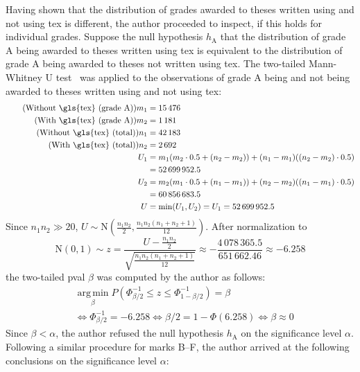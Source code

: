 \documentclass[12pt,twoside,color,table]%
  {fithesis3/fithesis3/fithesis3} %
\begin{document}
  Having shown that the distribution of grades awarded to theses
  written using and not using \gls{tex} is different, the author
  proceeded to inspect, if this holds for individual grades.
  Suppose the null \gls{hypothesis} $h_\text{A}$ that the
  distribution of grade A being awarded to theses written using
  \gls{tex} is equivalent to the distribution of grade A being
  awarded to theses not written using \gls{tex}. The two-tailed
  Mann-Whitney U test~\cite{mann47,manntut} was applied to the
  observations of grade A being and not being awarded to theses
  written using and not using \gls{tex}: \begin{align}
    \tag{Without \gls{tex} (grade A)} m_1 &= 15\,476 \\
    \tag{With \gls{tex} (grade A)}    m_2 &= 1\,181  \\
    \tag{Without \gls{tex} (total)} n_1 &= 42\,183 \\
    \tag{With \gls{tex} (total)}    n_2 &= 2\,692  \\
    U_1 &=  m_1(m_2\cdot0.5+(n_2-m_2))+
                  (n_1-m_1)((n_2-m_2)\cdot0.5) \\
      \nonumber&=52\,699\,952.5 \\
    U_2 &=  m_2(m_1\cdot0.5+(n_1-m_1))+
                  (n_2-m_2)((n_1-m_1)\cdot0.5) \\
      \nonumber&=60\,856\,683.5 \\
    U &= \min(U_1,U_2) = U_1 = 52\,699\,952.5
  \end{align} Since $n_1n_2\gg20$,
  $U\sim\text{N}\left(\frac{n_1n_2}2,
  \frac{n_1n_2(n_1+n_2+1)}{12}\right)$. After normalization to
  \begin{equation}
    \text{N}(0,1)\sim z =
    \frac{U-\frac{n_1n_2}2}{\sqrt{\frac{n_1n_2(n_1+n_2+1)}{12}}}
    \approx-\frac{4\,078\,365.5}{651\,662.46}\approx-6.258
  \end{equation} the two-tailed \gls{pval} $\beta$ was computed by
  the author as follows:\begin{align}
    & \operatorname{arg\,min}\limits_{\beta} P(\Phi^{-1}_{\beta/2}
        \leq z\leq\Phi^{-1}_{1-\beta/2})=\beta \\
    \nonumber& \iff\Phi^{-1}_{\beta/2}=-6.258 \iff\beta/2=1-
        \Phi(6.258)\iff\beta\approx 0
  \end{align}Since $\beta<\alpha$, the author refused the null
  \gls{hypothesis} $h_\text{A}$ on the significance level $\alpha$.
  Following a similar procedure for marks B--F, the author arrived
  at the following conclusions on the significance level $\alpha$:
\end{document}
